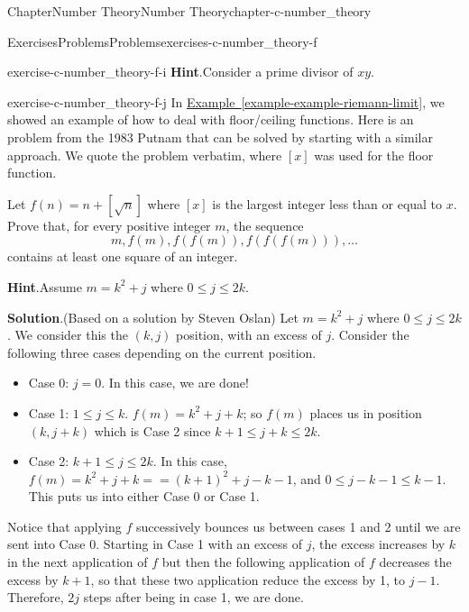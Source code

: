 \documentclass[oneside,10pt,]{book}
\newcommand{\blocktitlefont}{\relax}
\newcommand{\xreffont}{\relax}
\numberwithin{equation}{section}
\begin{document}
\begin{chapterptx}{Chapter}{Number Theory}{}{Number Theory}{}{}{chapter-c-number_theory}
\begin{exercises-section}{Exercises}{Problems}{}{Problems}{}{}{exercises-c-number_theory-f}
\begin{divisionexercise}{7}{}{}{exercise-c-number_theory-f-i}
\noindent\textbf{\blocktitlefont Hint}.\hypertarget{hint-c-number_theory-f-i-b}{}\quad{}Consider a prime divisor of \(x y\).%
\end{divisionexercise}%
\begin{divisionexercise}{8}{}{}{exercise-c-number_theory-f-j}%
In \hyperref[example-example-riemann-limit]{Example~{\xreffont\ref{example-example-riemann-limit}}}, we showed an example of how to deal with floor\slash{}ceiling functions. Here is an problem from the 1983 Putnam that can be solved by starting with a similar approach.  We quote the problem verbatim, where \([x]\) was used for the floor function.%
\par
Let \(f(n)=n +[\sqrt{n}]\) where \([x]\) is the largest integer less than or equal to \(x\).  Prove that, for every positive integer \(m\), the sequence%
\begin{equation*}
m, f(m), f(f(m)), f(f(f(m))), \dots
\end{equation*}
contains at least one square of an integer.%
\par\smallskip%
\noindent\textbf{\blocktitlefont Hint}.\hypertarget{hint-c-number_theory-f-j-b}{}\quad{}Assume \(m = k^2 + j\) where \(0 \leq j \leq 2k\).%
\par\smallskip%
\noindent\textbf{\blocktitlefont Solution}.\hypertarget{solution-c-number_theory-f-j-c}{}\quad{}(Based on a solution by Steven Oslan)  Let \(m = k^2 + j\) where \(0 \leq j \leq 2k\). We consider this the \((k,j)\) position, with an excess of \(j\).  Consider the following three cases depending on the current position.%
\begin{itemize}[label=\textbullet]
\item{}Case 0: \(j=0\). In this case, we are done!%
\item{}Case 1: \(1 \leq j \leq k\).  \(f(m)=k^2 + j + k\); so \(f(m)\) places us in position \((k,j+k)\) which is Case 2 since  \(k+1 \leq j +k \leq 2k.\)%
\item{}Case 2: \(k+1 \leq j \leq 2k\).   In this case, \(f(m)=k^2 + j + k = = (k+1)^2 + j-k-1\), and \(0 \leq j-k-1 \leq k-1\). This puts us into either Case 0 or Case 1.%
\end{itemize}
Notice that applying \(f\) successively bounces us between cases 1 and 2 until we are sent into Case 0.  Starting in Case 1 with an excess of \(j\), the excess increases by \(k\) in the next application of \(f\) but then the following application of \(f\) decreases the excess by \(k+1\), so that these two application reduce the excess by 1, to \(j-1\).  Therefore, \(2 j\) steps after being in case 1, we are done.%

\end{divisionexercise}
\end{exercises-section}
\end{chapterptx}
\end{document}
